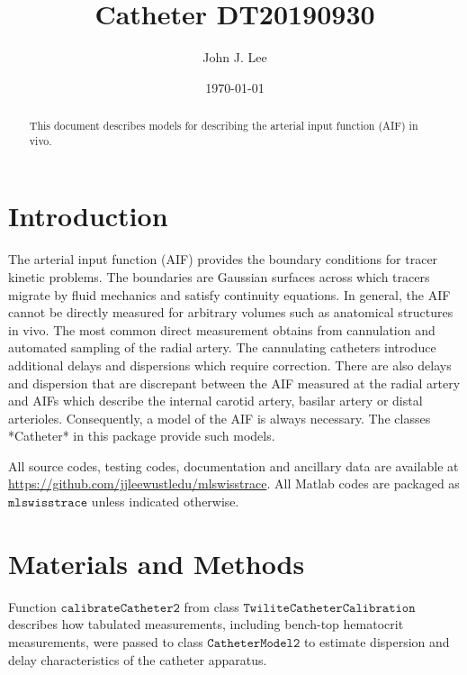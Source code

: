 \title{Catheter DT20190930}
\author         {John J. Lee}
\date{\today}

\begin{abstract}
This document describes models for describing the arterial input function
(AIF) in vivo.  
\end{abstract}

\maketitle

\section{Introduction}

The arterial input function (AIF) provides the boundary conditions 
for tracer kinetic problems.  The boundaries are Gaussian surfaces
across which tracers migrate by fluid mechanics and satisfy continuity
equations.  In general, the AIF cannot be directly measured for arbitrary 
volumes such as anatomical structures in vivo.  The most common direct 
measurement obtains from cannulation and automated sampling of the radial 
artery.  The cannulating catheters introduce additional delays and 
dispersions which require correction.  There are also delays and dispersion
that are discrepant between the AIF measured at the radial artery and AIFs
which describe the internal carotid artery, basilar artery or distal
arterioles.  Consequently, a model of the AIF is always necessary.  The
classes *Catheter* in this package provide such models.  

All source codes, testing codes, documentation and ancillary data are
available at \url{https://github.com/jjleewustledu/mlswisstrace}.  
All Matlab codes are packaged as $\texttt{mlswisstrace}$ unless
indicated otherwise.

\section{Materials and Methods}

Function $\texttt{calibrateCatheter2}$ from class 
$\texttt{TwiliteCatheterCalibration}$ describes how tabulated measurements, 
including bench-top hematocrit measurements, were passed to class 
$\texttt{CatheterModel2}$ to estimate dispersion and delay characteristics 
of the catheter apparatus.  

